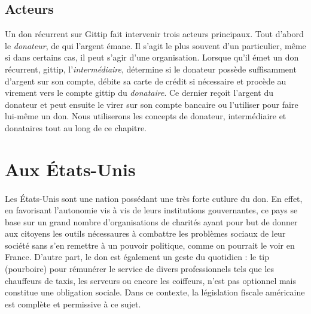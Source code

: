         \subsection{Acteurs}
            Un don récurrent sur Gittip fait intervenir trois acteurs
            principaux.
            Tout d'abord le \emph{donateur}, de qui l'argent émane.
            Il s'agit le plus souvent d'un particulier, même si dans
            certains cas, il peut s'agir d'une organisation.
            Lorsque qu'il émet un don récurrent, gittip,
            l'\emph{intermédiaire}, détermine si
            le donateur possède suffisamment d'argent sur son compte,
            débite sa carte de crédit si nécessaire et procède au
            virement vers le compte gittip du \emph{donataire}. Ce dernier
            reçoit l'argent du donateur et peut ensuite le virer sur son
            compte bancaire ou l'utiliser pour faire lui-même un don.
            Nous utiliserons les concepts de donateur, intermédiaire et
            donataires tout au long de ce chapitre.
    \section{Aux États-Unis}
        \paragraph{}
            Les États-Unis sont une nation possédant une très forte cutlure
            du don. En effet, en favorisant l'autonomie vis à vis de leurs
            institutions gouvernantes, ce pays se base sur un grand nombre
            d'organisations de charités ayant pour but de donner aux citoyens
            les outils nécessaures à combattre les problèmes sociaux de leur
            société sans s'en remettre à un pouvoir politique, comme on
            pourrait le voir en France.
            D'autre part, le don est également un geste du quotidien :
            le tip (pourboire) pour rémunérer le service de divers
            professionnels tels que les chauffeurs de taxis, les serveurs ou
            encore les coiffeurs, n'est pas optionnel mais constitue une
            obligation sociale.
            Dans ce contexte, la législation fiscale américaine est
            complète et permissive à ce sujet.
